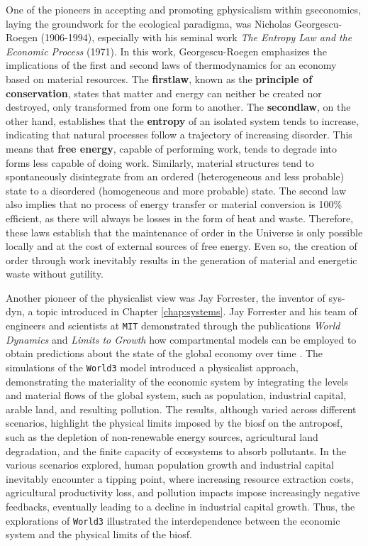 \documentclass[./main_en.tex]{subfiles}
\begin{document}
\par One of the pioneers in accepting and promoting \gls{gphysicalism} within \gls{gseconomics}, laying the groundwork for the ecological \gls{paradigma}, was Nicholas Georgescu-Roegen (1906-1994), especially with his seminal work \textit{The Entropy Law and the Economic Process} (1971). In this work, Georgescu-Roegen emphasizes the implications of the first and second laws of thermodynamics for an economy based on material resources. The \textbf{\gls{firstlaw}}, known as the \textbf{principle of conservation}, states that matter and energy can neither be created nor destroyed, only transformed from one form to another. The \textbf{\gls{secondlaw}}, on the other hand, establishes that the \textbf{entropy} of an isolated \gls{system} tends to increase, indicating that natural processes follow a trajectory of increasing disorder. This means that \textbf{free energy}, capable of performing work, tends to degrade into forms less capable of doing work. Similarly, material structures tend to spontaneously disintegrate from an ordered (heterogeneous and less probable) state to a disordered (homogeneous and more probable) state. The second law also implies that no process of energy transfer or material conversion is 100\% efficient, as there will always be losses in the form of heat and waste. Therefore, these laws establish that the maintenance of order in the Universe is only possible locally and at the cost of external sources of free energy. Even so, the creation of order through work inevitably results in the generation of material and energetic waste without \gls{gutility}.

\par Another pioneer of the physicalist view was Jay Forrester, the inventor of \gls{sys-dyn}, a topic introduced in Chapter \ref{chap:systems}. Jay Forrester and his team of engineers and scientists at \texttt{MIT} demonstrated through the publications \textit{World Dynamics} and \textit{Limits to Growth} how compartmental models can be employed to obtain predictions about the state of the global economy over time \cite{Forrester1973a, meadows1974}. The simulations of the \texttt{World3} \gls{model} introduced a physicalist approach, demonstrating the materiality of the economic \gls{system} by integrating the levels and material flows of the global \gls{system}, such as population, industrial capital, arable land, and resulting pollution. The results, although varied across different scenarios, highlight the physical limits imposed by the \gls{biosf} on the \gls{antroposf}, such as the depletion of non-renewable energy sources, agricultural land degradation, and the finite capacity of ecosystems to absorb pollutants. In the various scenarios explored, human population growth and industrial capital inevitably encounter a tipping point, where increasing resource extraction costs, agricultural productivity loss, and pollution impacts impose increasingly negative feedbacks, eventually leading to a decline in industrial capital growth. Thus, the explorations of \texttt{World3} illustrated the interdependence between the economic \gls{system} and the physical limits of the \gls{biosf}.
\end{document}
